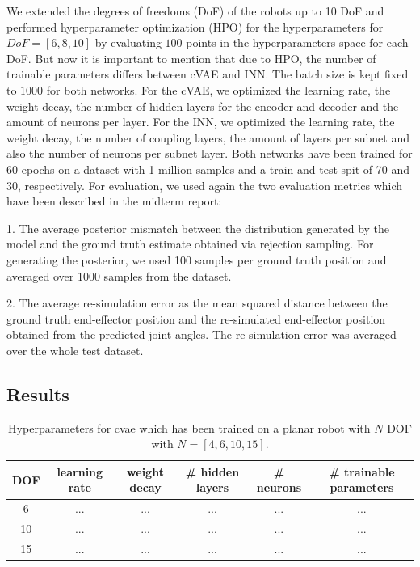 \documentclass[conference]{IEEEtran}
\begin{document}
We extended the degrees of freedoms (DoF) of the robots up to 10 DoF and performed hyperparameter optimization (HPO) for the hyperparameters for $DoF = [6, 8, 10]$ by evaluating $100$ points in the hyperparameters space for each DoF. But now it is important to mention that due to HPO, the number of trainable parameters differs between cVAE and INN. The batch size is kept fixed to $1000$ for both networks.
For the cVAE, we optimized the learning rate, the weight decay, the number of hidden layers for the encoder and decoder and the amount of neurons per layer. For the INN, we optimized the learning rate, the weight decay, the number of coupling layers, the amount of layers per subnet and also the number of neurons per subnet layer.
Both networks have been trained for 60 epochs on a dataset with 1 million samples and a train and test spit of 70 and 30, respectively. For evaluation, we used again the two evaluation metrics which have been described in the midterm report:

1. The average posterior mismatch between the distribution generated by the model and the ground truth estimate obtained via rejection sampling. For generating the posterior, we used 100 samples per ground truth position and averaged over 1000 samples from the dataset.

2. The average re-simulation error as the mean squared distance between the ground truth end-effector position and the re-simulated end-effector position obtained from the predicted joint angles. The re-simulation error was averaged over the whole test dataset.

\subsection*{Results}

\begin{table}[h]
\centering
\begin{tabular}{|c|c|c|c|c|c|}
\hline
 DOF & learning rate & weight decay & \# hidden layers & \# neurons & \# trainable parameters\\
 \hline
 6  & ... & ...& ... & ... & ...\\
 10  & ... & ... & ... & ... & ...\\
 15  & ... & ... & ... & ... & ...\\
 \hline
\end{tabular}
\vspace{5pt}
\caption{\label{tab:results:cvae}  Hyperparameters for cvae which has been trained on a planar robot with $N$ DOF with $N=[4, 6, 10, 15]$.}
\end{table}
\end{document}
